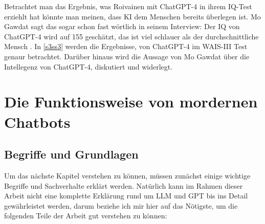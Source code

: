 	Betrachtet man das Ergebnis, was Roivainen mit ChatGPT-4 in ihrem IQ-Test erziehlt hat könnte man meinen,
	dass KI dem Menschen bereits überlegen ist. Mo Gawdat sagt das sogar schon fast wörtlich in seinem Interview:
	\glqq{}Der IQ von ChatGPT-4 wird auf 155 geschätzt, das ist viel schlauer als der durchschnittliche Mensch\grqq{} 
	\cite{gawdat23}. In \ref{s3ss3} werden die Ergebnisse, von ChatGPT-4 im WAIS-III Test genaur betrachtet.
	Darüber hinaus wird die Aussage von Mo Gawdat über die Intellegenz von ChatGPT-4, diskutiert und widerlegt. 	

\clearpage	
\section{Die Funktionsweise von mordernen Chatbots}
	\subsection{Begriffe und Grundlagen}\label{s2ss1}
	Um das nächste Kapitel verstehen zu können, müssen zunächst einige wichtige Begriffe und Sachverhalte erklärt 
	werden. Natürlich kann im Rahmen dieser Arbeit nicht eine komplette Erklärung rund um LLM und GPT bis ins Detail
	gewährleistet werden, darum beziehe ich mir hier auf das Nötigste, um die folgenden Teile der Arbeit gut verstehen
	zu können: 
	

